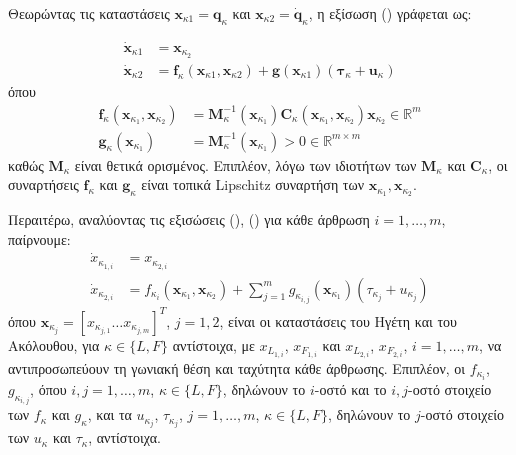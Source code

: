 \bigskip
Θεωρώντας τις καταστάσεις \( \mathbf{x}_{\kappa 1} = \mathbf{q}_{\kappa} \) και \( \mathbf{x}_{\kappa 2} = \dot{\mathbf{q}}_{\kappa} \), η εξίσωση () γράφεται ως:

\begin{align}
  \dot{\mathbf{x}}_{\kappa 1} & = \mathbf{x}_{\kappa_2} \label{xkappa1dot}                                                                                      \\
  \dot{\mathbf{x}}_{\kappa 2} & = \mathbf{f}_{\kappa}(\mathbf{x}_{\kappa 1}, \mathbf{x}_{\kappa 2}) + \mathbf{g}(\mathbf{x}_{\kappa 1})(\mathbf{\tau}_{\kappa} + \mathbf{u}_{\kappa}) \label{xkappa2dot}
\end{align}
όπου
\begin{align*}
  \mathbf{f}_{\kappa}(\mathbf{x}_{\kappa_1}, \mathbf{x}_{\kappa_2}) & = \mathbf{M}_{\kappa}^{-1}(\mathbf{x}_{\kappa_1}) \mathbf{C}_{\kappa}(\mathbf{x}_{\kappa_1}, \mathbf{x}_{\kappa_2}) \mathbf{x}_{\kappa_2} \in \mathbb{R}^{m} \\
  \mathbf{g}_{\kappa}(\mathbf{x}_{\kappa_1})               & = \mathbf{M}_{\kappa}^{-1}(\mathbf{x}_{\kappa_1}) > 0 \in \mathbb{R}^{m \times m}
\end{align*}
καθώς \( \mathbf{M}_{\kappa} \) είναι θετικά ορισμένος. Επιπλέον, λόγω των ιδιοτήτων των \( \mathbf{M}_{\kappa} \) και \( \mathbf{C}_{\kappa} \), οι συναρτήσεις \( \mathbf{f}_{\kappa} \) και \( \mathbf{g}_{\kappa} \) είναι τοπικά Lipschitz συναρτήση των \( \mathbf{x}_{\kappa_1},  \mathbf{x}_{\kappa_2} \).

\bigskip
Περαιτέρω, αναλύοντας τις εξισώσεις (), () για κάθε άρθρωση \( i = 1, \dots, m \), παίρνουμε:
\begin{align}
  \dot{x}_{\kappa_{1,i}} & = x_{\kappa_{2,i}} \label{xkappa1dotwithi}                                                                                                         \\
  \dot{x}_{\kappa_{2,i}} & = f_{\kappa_i}(\mathbf{x}_{\kappa_1}, \mathbf{x}_{\kappa_2}) + \sum_{j=1}^{m} g_{\kappa_{i,j}}(\mathbf{x}_{\kappa_1})(\tau_{\kappa_j} + u_{\kappa_j}) \label{xkappa2dotwithi}
\end{align}
όπου \( \mathbf{x}_{\kappa_j} = [ x_{\kappa_{j,1}} \dots  x_{\kappa_{j,m}} ]^{T} \), \( j = 1, 2 \), είναι οι καταστάσεις του Ηγέτη και του Ακόλουθου, για \( \kappa \in \{ L, F \} \) αντίστοιχα, με \( x_{L_{1,i}} \), \( x_{F_{1,i}} \) και \( x_{L_{2,i}} \), \( x_{F_{2,i}} \), \( i = 1, \dots, m \), να αντιπροσωπεύουν τη γωνιακή θέση και ταχύτητα κάθε άρθρωσης. Επιπλέον, οι \( f_{\kappa_i} \), \( g_{\kappa_{i,j}} \), όπου \( i, j = 1, \dots, m \), \( \kappa \in \{ L, F \} \), δηλώνουν το \( i \)-οστό και το \( i,j \)-οστό στοιχείο των \( f_{\kappa} \) και \( g_{\kappa} \), και τα \( u_{\kappa_j} \), \( \tau_{\kappa_j} \), \( j = 1, \dots, m \), \( \kappa \in \{ L, F \} \), δηλώνουν το \( j \)-οστό στοιχείο των \( u_{\kappa} \) και \( \tau_{\kappa} \), αντίστοιχα.

